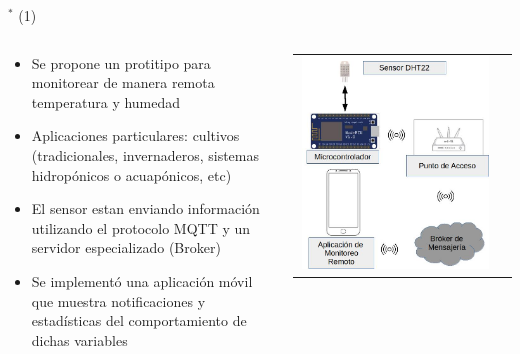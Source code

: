 
\begin{frame}{$^*$  (1)}

\begin{columns}
\begin{column}{0.70\textwidth}
	\begin{itemize}
		\item Se propone un protitipo para monitorear de manera remota temperatura y humedad
        \item Aplicaciones particulares: cultivos (tradicionales, invernaderos, sistemas hidropónicos o acuapónicos, etc)
		\item El sensor estan enviando información utilizando el protocolo MQTT y un servidor especializado (Broker)
        \item Se implementó una aplicación móvil que muestra notificaciones y estadísticas del comportamiento de dichas variables
	\end{itemize}
\end{column}
\begin{column}{0.30\textwidth}  
\begin{center}
     \begin{tabular}{cc}
         \includegraphics[width=0.98\textwidth]{2021_IoT_JoseRamon/figs/Figura_Refrigeradores.jpg}\\         
      \end{tabular}
\end{center}
\end{column} 
\end{columns} 


\end{frame}



